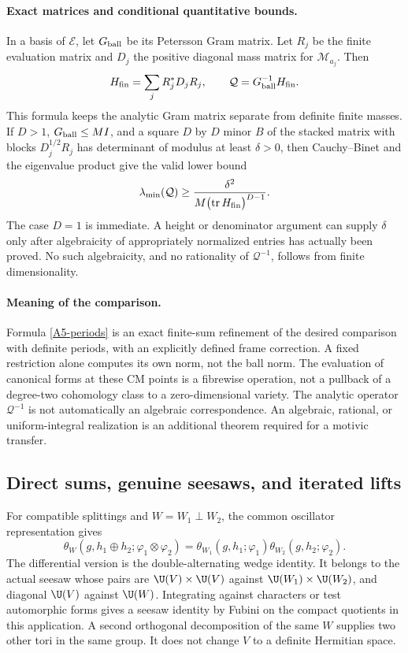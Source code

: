 \documentclass[11pt]{article}
\theoremstyle{definition}\newtheorem{definition}[theorem]{Definition}\newtheorem{remark}[theorem]{Remark}
\begin{document}
\paragraph{Exact matrices and conditional quantitative bounds.}
In a basis of $\mathcal E$, let $G_{\rm ball}$ be its Petersson Gram
matrix. Let $R_j$ be the finite evaluation matrix and $D_j$ the
positive diagonal mass matrix for $\mathcal M_{a_j}$. Then
\[
 H_{\rm fin}=\sum_jR_j^*D_jR_j,\qquad
                  \mathcal Q=G_{\rm ball}^{-1}H_{\rm fin}.
\]
This formula keeps the analytic Gram matrix separate from definite
finite masses. If $D>1$, $G_{\rm ball}\leq M I$, and a square
$D$ by $D$ minor $B$ of the stacked matrix with blocks
$D_j^{1/2}R_j$ has determinant of modulus at least $\delta>0$, then
Cauchy--Binet and the eigenvalue product give the valid lower bound
\[
 \lambda_{\min}(\mathcal Q)
 \geq\frac{\delta^2}{M\bigl(\operatorname{tr}H_{\rm fin}\bigr)^{D-1}}.
\]
The case $D=1$ is immediate. A height or denominator argument can
supply $\delta$ only after algebraicity of appropriately normalized
entries has actually been proved. No such algebraicity, and no
rationality of $\mathcal Q^{-1}$, follows from finite dimensionality.

\paragraph{Meaning of the comparison.}
Formula \eqref{A5-periods} is an exact finite-sum refinement of the
desired comparison with definite periods, with an explicitly defined
frame correction. A fixed restriction alone computes its own norm,
not the ball norm. The evaluation of canonical forms at these CM
points is a fibrewise operation, not a pullback of a degree-two
cohomology class to a zero-dimensional variety. The analytic operator
$\mathcal Q^{-1}$ is not automatically an algebraic correspondence.
An algebraic, rational, or uniform-integral realization is an
additional theorem required for a motivic transfer.

\subsection{Direct sums, genuine seesaws, and iterated lifts}

For compatible splittings and $W=W_1\perp W_2$, the common oscillator
representation gives
\[
 \theta_W(g,h_1\oplus h_2;\varphi_1\otimes\varphi_2)
 =\theta_{W_1}(g,h_1;\varphi_1)
             \theta_{W_2}(g,h_2;\varphi_2).
\]
The differential version is the double-alternating wedge identity.
It belongs to the actual seesaw whose pairs are
$\U(V)\times\U(V)$ against $\U(W_1)\times\U(W_2)$, and diagonal
$\U(V)$ against $\U(W)$. Integrating against characters or test
automorphic forms gives a seesaw identity by Fubini on the compact
quotients in this application. A second orthogonal decomposition of
the same $W$ supplies two other tori in the same group. It does not
change $V$ to a definite Hermitian space.
\end{document}
